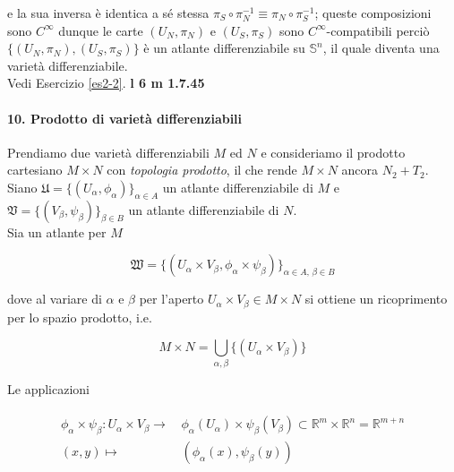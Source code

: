 e la sua inversa è identica a sé stessa $ \pi_{S} \circ \pi_{N}^{-1} \equiv \pi_{N} \circ \pi_{S}^{-1} $; queste composizioni sono $ C^{\infty} $ dunque le carte $ (U_{N},\pi_{N}) $ e $ (U_{S},\pi_{S}) $ sono $ C^{\infty} $-compatibili perciò $ \{(U_{N},\pi_{N}),(U_{S},\pi_{S})\} $ è un atlante differenziabile su $ \mathbb{S}^{n} $, il quale diventa una varietà differenziabile.\\
Vedi Esercizio \ref{es2-2}. \textbf{l 6 m 1.7.45}

\paragraph{10. Prodotto di varietà differenziabili}

Prendiamo due varietà differenziabili $ M $ ed $ N $ e consideriamo il prodotto cartesiano $ M \times N $ con \textit{topologia prodotto}, il che rende $ M \times N $ ancora $ N_{2}+T_{2} $.\\
Siano $ \mathfrak{U} = \{(U_{\alpha},\phi_{\alpha})\}_{\alpha \in A} $ un atlante differenziabile di $ M $ e $ \mathfrak{V} = \{(V_{\beta},\psi_{\beta})\}_{\beta \in B} $ un atlante differenziabile di $ N $.\\
Sia un atlante per $ M $

\begin{equation}
	\mathfrak{W} = \{(U_{\alpha} \times V_{\beta},\phi_{\alpha} \times \psi_{\beta})\}_{\alpha \in A, \, \beta \in B}
\end{equation}

dove al variare di $ \alpha $ e $ \beta $ per l'aperto $ U_{\alpha} \times V_{\beta} \in M \times N $ si ottiene un ricoprimento per lo spazio prodotto, i.e.

\begin{equation}
	M \times N = \bigcup_{\alpha,\beta} \{(U_{\alpha} \times V_{\beta})\}
\end{equation}

Le applicazioni

\begin{align}
	\begin{split}
		\phi_{\alpha} \times \psi_{\beta} : U_{\alpha} \times V_{\beta} \to& \, \phi_{\alpha}(U_{\alpha}) \times \psi_{\beta}(V_{\beta}) \subset \mathbb{R}^{m} \times \mathbb{R}^{n} = \mathbb{R}^{m+n}\\
		(x,y) \mapsto& \, (\phi_{\alpha}(x),\psi_{\beta}(y))
	\end{split}
\end{align}

